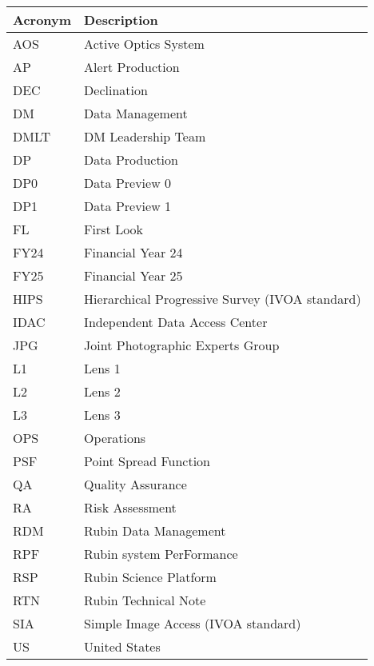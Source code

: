 \addtocounter{table}{-1}
\begin{longtable}{p{}p{}}\hline
\textbf{Acronym} & \textbf{Description}  \\\hline

AOS & Active Optics System \\\hline
AP & Alert Production \\\hline
DEC & Declination \\\hline
DM & Data Management \\\hline
DMLT & DM Leadership Team \\\hline
DP & Data Production \\\hline
DP0 & Data Preview 0 \\\hline
DP1 & Data Preview 1 \\\hline
FL & First Look \\\hline
FY24 & Financial Year 24 \\\hline
FY25 & Financial Year 25 \\\hline
HIPS & Hierarchical Progressive Survey (IVOA standard) \\\hline
IDAC & Independent Data Access Center \\\hline
JPG & Joint Photographic Experts Group \\\hline
L1 & Lens 1 \\\hline
L2 & Lens 2 \\\hline
L3 & Lens 3 \\\hline
OPS & Operations \\\hline
PSF & Point Spread Function \\\hline
QA & Quality Assurance \\\hline
RA & Risk Assessment \\\hline
RDM & Rubin Data Management \\\hline
RPF & Rubin system PerFormance \\\hline
RSP & Rubin Science Platform \\\hline
RTN & Rubin Technical Note \\\hline
SIA & Simple Image Access (IVOA standard) \\\hline
US & United States \\\hline
\end{longtable}

